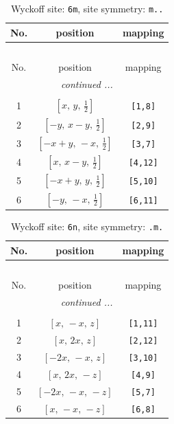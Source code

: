 \documentclass[fleqn,8pt]{jsarticle}
\begin{document}
\renewcommand{\arraystretch}{1.2}
\begin{longtable}{ccc}
\caption{Wyckoff site: {\tt 6m}, site symmetry: {\tt m..}}
 \\
 \hline \hline
No. & position & mapping \\ \hline \endfirsthead

\multicolumn{2}{l}{\tablename\ \thetable{}} \\
 \hline \hline
No. & position & mapping \\ \hline \endhead

 \hline \hline
\multicolumn{2}{r}{\footnotesize\it continued ...} \\ \endfoot

 \hline \hline
\multicolumn{2}{r}{} \\ \endlastfoot

1 & $\left[ x,\, y,\, \frac{1}{2} \right]$ & {\tt [1,8]} \\ \hline
2 & $\left[ - y,\, x - y,\, \frac{1}{2} \right]$ & {\tt [2,9]} \\ \hline
3 & $\left[ - x + y,\, - x,\, \frac{1}{2} \right]$ & {\tt [3,7]} \\ \hline
4 & $\left[ x,\, x - y,\, \frac{1}{2} \right]$ & {\tt [4,12]} \\ \hline
5 & $\left[ - x + y,\, y,\, \frac{1}{2} \right]$ & {\tt [5,10]} \\ \hline
6 & $\left[ - y,\, - x,\, \frac{1}{2} \right]$ & {\tt [6,11]} \\
\end{longtable}
\renewcommand{\arraystretch}{1.2}
\begin{longtable}{ccc}
\caption{Wyckoff site: {\tt 6n}, site symmetry: {\tt .m.}}
 \\
 \hline \hline
No. & position & mapping \\ \hline \endfirsthead

\multicolumn{2}{l}{\tablename\ \thetable{}} \\
 \hline \hline
No. & position & mapping \\ \hline \endhead

 \hline \hline
\multicolumn{2}{r}{\footnotesize\it continued ...} \\ \endfoot

 \hline \hline
\multicolumn{2}{r}{} \\ \endlastfoot

1 & $\left[ x,\, - x,\, z \right]$ & {\tt [1,11]} \\ \hline
2 & $\left[ x,\, 2 x,\, z \right]$ & {\tt [2,12]} \\ \hline
3 & $\left[ - 2 x,\, - x,\, z \right]$ & {\tt [3,10]} \\ \hline
4 & $\left[ x,\, 2 x,\, - z \right]$ & {\tt [4,9]} \\ \hline
5 & $\left[ - 2 x,\, - x,\, - z \right]$ & {\tt [5,7]} \\ \hline
6 & $\left[ x,\, - x,\, - z \right]$ & {\tt [6,8]} \\
\end{longtable}
\end{document}

